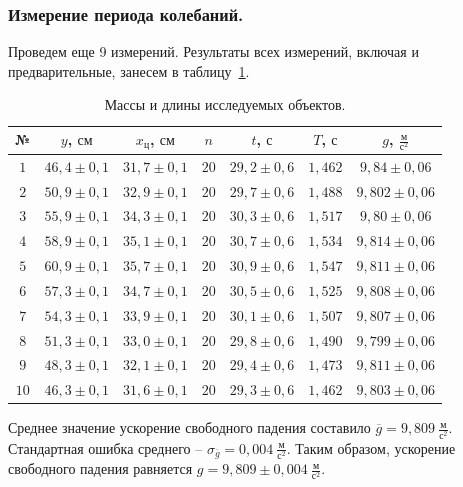 \documentclass[a4paper,11pt]{article}
\begin{document}
\subsubsection{Измерение периода колебаний.} %
Проведем еще 9 измерений. Результаты всех измерений, включая и предварительные, занесем в таблицу~\ref{table:tab2}.
\begin{table}[h!]
\centering
\begin{tabular}{ ||c|c|c|c|c|c|c|| }
  \hline
  № & $y$, $см$ & $x_{ц}$, $см$ & $n$ & $t$, $с$ & $T$, $с$ & $g$, $\frac{м}{с^{2}}$ \\
  \hline
  $1$ & $46,4 \pm 0,1$ & $31,7 \pm 0,1$ & $20$ & $29,2 \pm 0,6$ & $1,462$ & $9,84 \pm 0,06$ \\
  $2$ & $50,9 \pm 0,1$ & $32,9 \pm 0,1$ & $20$ & $29,7 \pm 0,6$ & $1,488$ & $9,802 \pm 0,06$ \\
  $3$ & $55,9 \pm 0,1$ & $34,3 \pm 0,1$ & $20$ & $30,3 \pm 0,6$ & $1,517$ & $9,80 \pm 0,06$ \\
  $4$ & $58,9 \pm 0,1$ & $35,1 \pm 0,1$ & $20$ & $30,7 \pm 0,6$ & $1,534$ & $9,814 \pm 0,06$ \\
  $5$ & $60,9 \pm 0,1$ & $35,7 \pm 0,1$ & $20$ & $30,9 \pm 0,6$ & $1,547$ & $9,811 \pm 0,06$ \\
  $6$ & $57,3 \pm 0,1$ & $34,7 \pm 0,1$ & $20$ & $30,5 \pm 0,6$ & $1,525$ & $9,808 \pm 0,06$ \\
  $7$ & $54,3 \pm 0,1$ & $33,9 \pm 0,1$ & $20$ & $30,1 \pm 0,6$ & $1,507$ & $9,807 \pm 0,06$ \\
  $8$ & $51,3 \pm 0,1$ & $33,0 \pm 0,1$ & $20$ & $29,8 \pm 0,6$ & $1,490$ & $9,799 \pm 0,06$ \\
  $9$ & $48,3 \pm 0,1$ & $32,1 \pm 0,1$ & $20$ & $29,4 \pm 0,6$ & $1,473$ & $9,811 \pm 0,06$ \\
  $10$ & $46,3 \pm 0,1$ & $31,6 \pm 0,1$ & $20$ & $29,3 \pm 0,6$ & $1,462$ & $9,803 \pm 0,06$ \\
  \hline
\end{tabular}
    \caption{Массы и длины исследуемых объектов.}
    \label{table:tab2}
\end{table}\newline
Среднее значение ускорение свободного падения составило $\overline{g} = 9,809\ \frac{м}{с^{2}}$.\newline
Стандартная ошибка среднего -- $\sigma_{\overline{g}} = 0,004\ \frac{м}{с^{2}}$.\newline
Таким образом, ускорение свободного падения равняется $g = 9,809 \pm 0,004\ \frac{м}{с^{2}}$.
\end{document}
